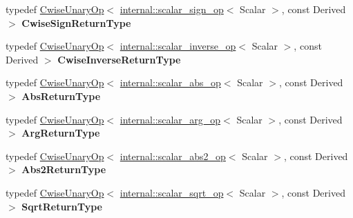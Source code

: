 \begin{DoxyCompactItemize}
\item 
\mbox{\label{class_eigen_1_1_array_base_a58a5e7c58fac7618c7cd4221249558e5}} 
typedef \mbox{\hyperlink{class_eigen_1_1_cwise_unary_op}{Cwise\+Unary\+Op}}$<$ \mbox{\hyperlink{struct_eigen_1_1internal_1_1scalar__sign__op}{internal\+::scalar\+\_\+sign\+\_\+op}}$<$ Scalar $>$, const Derived $>$ {\bfseries Cwise\+Sign\+Return\+Type}
\item 
\mbox{\label{class_eigen_1_1_array_base_a62ce2a3351723324014363a77b7a5a41}} 
typedef \mbox{\hyperlink{class_eigen_1_1_cwise_unary_op}{Cwise\+Unary\+Op}}$<$ \mbox{\hyperlink{struct_eigen_1_1internal_1_1scalar__inverse__op}{internal\+::scalar\+\_\+inverse\+\_\+op}}$<$ Scalar $>$, const Derived $>$ {\bfseries Cwise\+Inverse\+Return\+Type}
\item 
\mbox{\label{class_eigen_1_1_array_base_ab2078330b51488c120cafa46c2ae2bd3}} 
typedef \mbox{\hyperlink{class_eigen_1_1_cwise_unary_op}{Cwise\+Unary\+Op}}$<$ \mbox{\hyperlink{struct_eigen_1_1internal_1_1scalar__abs__op}{internal\+::scalar\+\_\+abs\+\_\+op}}$<$ Scalar $>$, const Derived $>$ {\bfseries Abs\+Return\+Type}
\item 
\mbox{\label{class_eigen_1_1_array_base_a699a8d022e83b4638c5cab07752199e5}} 
typedef \mbox{\hyperlink{class_eigen_1_1_cwise_unary_op}{Cwise\+Unary\+Op}}$<$ \mbox{\hyperlink{struct_eigen_1_1internal_1_1scalar__arg__op}{internal\+::scalar\+\_\+arg\+\_\+op}}$<$ Scalar $>$, const Derived $>$ {\bfseries Arg\+Return\+Type}
\item 
\mbox{\label{class_eigen_1_1_array_base_a24e9561ce8ee6cafb312e985173adce0}} 
typedef \mbox{\hyperlink{class_eigen_1_1_cwise_unary_op}{Cwise\+Unary\+Op}}$<$ \mbox{\hyperlink{struct_eigen_1_1internal_1_1scalar__abs2__op}{internal\+::scalar\+\_\+abs2\+\_\+op}}$<$ Scalar $>$, const Derived $>$ {\bfseries Abs2\+Return\+Type}
\item 
\mbox{\label{class_eigen_1_1_array_base_a75537526c5437a703573f0a8a66d6c97}} 
typedef \mbox{\hyperlink{class_eigen_1_1_cwise_unary_op}{Cwise\+Unary\+Op}}$<$ \mbox{\hyperlink{struct_eigen_1_1internal_1_1scalar__sqrt__op}{internal\+::scalar\+\_\+sqrt\+\_\+op}}$<$ Scalar $>$, const Derived $>$ {\bfseries Sqrt\+Return\+Type}

\end{DoxyCompactItemize}
